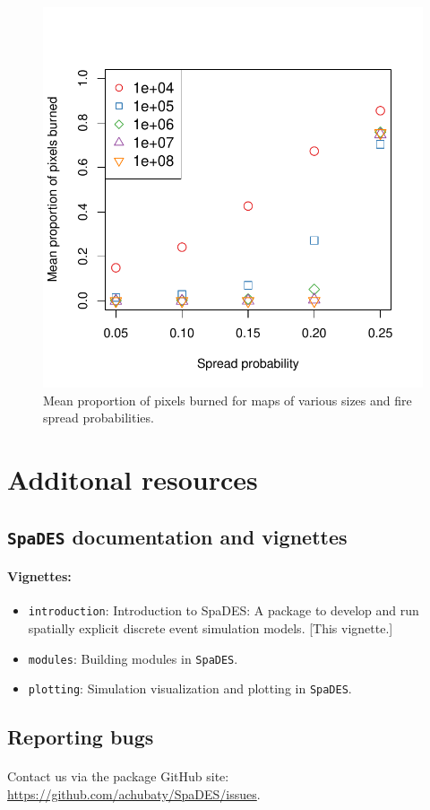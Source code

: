 \documentclass{article}
\begin{document}
\begin{figure}[!htbp]
  \centering
  \includegraphics[width=5in]{../inst/plot-area-burned.pdf}
	\caption{Mean proportion of pixels burned for maps of various sizes and fire spread probabilities.}
	\label{figure-area-burned}
\end{figure}


\newpage

\section{Additonal resources}

\subsection{\texttt{SpaDES} documentation and vignettes}

\paragraph{Vignettes:}

\begin{itemize}
\item \texttt{introduction}: Introduction to SpaDES: A package to develop and run spatially explicit discrete event simulation models. [This vignette.]
\item \texttt{modules}: Building modules in \texttt{SpaDES}.
\item \texttt{plotting}: Simulation visualization and plotting in \texttt{SpaDES}.
\end{itemize}

\subsection{Reporting bugs}

\paragraph{}
Contact us via the package GitHub site: \url{https://github.com/achubaty/SpaDES/issues}.
\end{document}
